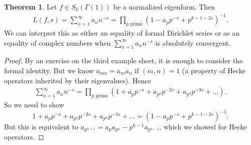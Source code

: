 \documentclass{article}
\theoremstyle{definition}
\newtheorem{theorem}{Theorem}[section]
\begin{document}
\begin{theorem}
    Let $f \in S_k(\Gamma(1))$ be a normalized eigenform. Then 
    \begin{align*}
        L(f,s) = \sum_{n=1}^{\infty} a_n n^{-s} = \prod_{p \text{ prime}}^{} (1-a_p p^{-s} + p^{k-1-2s})^{-1}.
    \end{align*}
    We can interpret this as either an equality of formal Dirichlet series or as an equality of complex numbers when $\sum_{n=1}^{\infty} a_n n^{-s}$ is absolutely convergent.
\end{theorem}
\begin{proof}
    By an exercise on the third example sheet, it is enough to consider the formal identity. But we know $a_{mn} = a_m a_n$ if $(m,n)=1$ (a property of Hecke operators inherited by their eigenvalues). Hence
    \begin{align*}
        \sum_{n=1}^{\infty} a_n n^{-s} = \prod_{p \text{ prime}}^{} (1 + a_p p^{-s} + a_{p^2}p^{-2s} + a_{p^3} p^{-3s} + \ldots).
    \end{align*}
    So we need to show \[
        1 + a_p p^{-s} + a_{p^2}p^{-2s} + a_{p^3} p^{-3s} + \ldots = (1 - a_p p^{-s} + p^{k-1-2s})^{-1}.
    \]
    But this is equivalent to $a_{p^{n+1}} = a_p a_{p^n} - p^{k-1}a_{p^{n-1}}$, which we showed for Hecke operators.
\end{proof}
\end{document}
